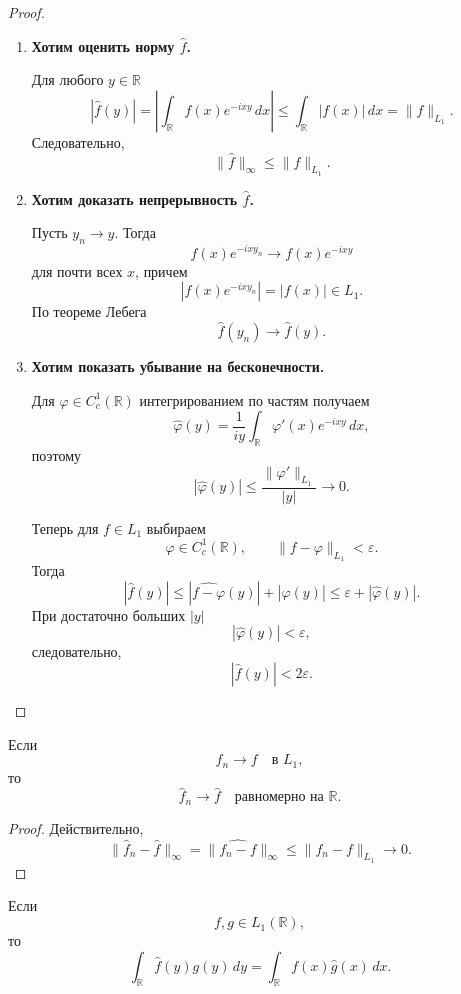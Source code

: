 \begin{proof}
	\begin{enumerate}
		\item
		\textbf{Хотим оценить норму \(\widehat f\).}
		
		Для любого \(y\in\mathbb R\)
		\[
		|\widehat f(y)|
		=
		\left|
		\int_{\mathbb R}f(x)e^{-ixy}\,dx
		\right|
		\leq
		\int_{\mathbb R}|f(x)|\,dx
		=
		\|f\|_{L_1}.
		\]
		Следовательно,
		\[
		\|\widehat f\|_\infty\leq\|f\|_{L_1}.
		\]
		
		\item
		\textbf{Хотим доказать непрерывность \(\widehat f\).}
		
		Пусть \(y_n\to y\). Тогда
		\[
		f(x)e^{-ixy_n}\to f(x)e^{-ixy}
		\]
		для почти всех \(x\), причем
		\[
		|f(x)e^{-ixy_n}|=|f(x)|\in L_1.
		\]
		По теореме Лебега
		\[
		\widehat f(y_n)\to\widehat f(y).
		\]
		
		\item
		\textbf{Хотим показать убывание на бесконечности.}
		
		Для \(\varphi\in C_c^1(\mathbb R)\) интегрированием по частям получаем
		\[
		\widehat\varphi(y)
		=
		\frac{1}{iy}
		\int_{\mathbb R}\varphi'(x)e^{-ixy}\,dx,
		\]
		поэтому
		\[
		|\widehat\varphi(y)|
		\leq
		\frac{\|\varphi'\|_{L_1}}{|y|}
		\to0.
		\]
		
		Теперь для \(f\in L_1\) выбираем
		\[
		\varphi\in C_c^1(\mathbb R),
		\qquad
		\|f-\varphi\|_{L_1}<\varepsilon.
		\]
		Тогда
		\[
		|\widehat f(y)|
		\leq
		|\widehat{f-\varphi}(y)|+|\widehat\varphi(y)|
		\leq
		\varepsilon+|\widehat\varphi(y)|.
		\]
		При достаточно больших \(|y|\)
		\[
		|\widehat\varphi(y)|<\varepsilon,
		\]
		следовательно,
		\[
		|\widehat f(y)|<2\varepsilon.
		\]
	\end{enumerate}
\end{proof}

\begin{corollary}
	Если
	\[
	f_n\to f
	\quad\text{в }L_1,
	\]
	то
	\[
	\widehat f_n\to\widehat f
	\quad\text{равномерно на }\mathbb R.
	\]
\end{corollary}

\begin{proof}
	Действительно,
	\[
	\|\widehat f_n-\widehat f\|_\infty
	=
	\|\widehat{f_n-f}\|_\infty
	\leq
	\|f_n-f\|_{L_1}
	\to0.
	\]
\end{proof}

\begin{theorem}
	Если
	\[
	f,g\in L_1(\mathbb R),
	\]
	то
	\[
	\int_{\mathbb R}\widehat f(y)g(y)\,dy
	=
	\int_{\mathbb R}f(x)\widehat g(x)\,dx.
	\]
\end{theorem}

